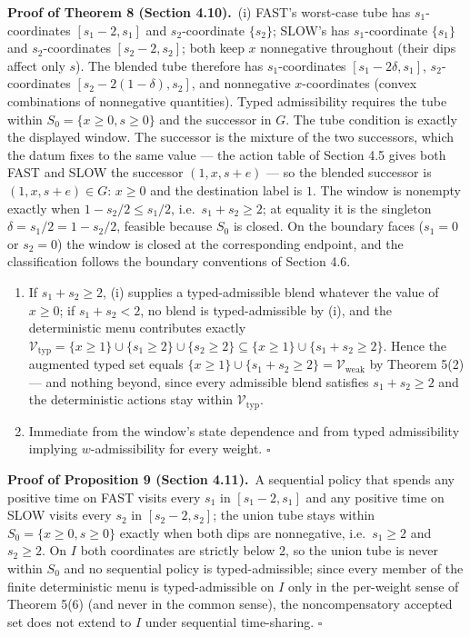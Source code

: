 \documentclass[review,11pt]{elsarticle}
\begin{document}
\textbf{Proof of Theorem 8 (Section 4.10).}\ (i) FAST's worst-case tube has \(s_1\)-coordinates
\([s_1 - 2, s_1]\) and \(s_2\)-coordinate \(\{s_2\}\); SLOW's has
\(s_1\)-coordinate \(\{s_1\}\) and \(s_2\)-coordinates
\([s_2 - 2, s_2]\); both keep \(x\) nonnegative throughout (their dips
affect only \(s\)). The blended tube therefore has \(s_1\)-coordinates
\([s_1 - 2\delta, s_1]\), \(s_2\)-coordinates
\([s_2 - 2(1-\delta), s_2]\), and nonnegative \(x\)-coordinates (convex
combinations of nonnegative quantities). Typed admissibility requires
the tube within \(S_0 = \{x \ge 0, s \ge 0\}\) and the successor in
\(G\). The tube condition is exactly the displayed window. The successor
is the mixture of the two successors, which the datum fixes to the same
value --- the action table of Section 4.5 gives both FAST and SLOW the
successor \((1, x, s + e)\) --- so the blended successor is
\((1, x, s + e) \in G\): \(x \ge 0\) and the destination label is \(1\).
The window is nonempty exactly when \(1 - s_2/2 \le s_1/2\),
i.e.~\(s_1 + s_2 \ge 2\); at equality it is the singleton
\(\delta = s_1/2 = 1 - s_2/2\), feasible because \(S_0\) is closed. On
the boundary faces (\(s_1 = 0\) or \(s_2 = 0\)) the window is closed at
the corresponding endpoint, and the classification follows the boundary
conventions of Section 4.6.

\begin{enumerate}
\def\labelenumi{(\roman{enumi})}
\setcounter{enumi}{1}
\item
  If \(s_1 + s_2 \ge 2\), (i) supplies a typed-admissible blend whatever
  the value of \(x \ge 0\); if \(s_1 + s_2 < 2\), no blend is
  typed-admissible by (i), and the deterministic menu contributes
  exactly
  \(\mathcal{V}_{\mathrm{typ}} = \{x \ge 1\} \cup \{s_1 \ge 2\} \cup \{s_2 \ge 2\} \subseteq \{x \ge 1\} \cup \{s_1 + s_2 \ge 2\}\).
  Hence the augmented typed set equals
  \(\{x \ge 1\} \cup \{s_1 + s_2 \ge 2\} = \mathcal{V}_{\mathrm{weak}}\)
  by Theorem 5(2) --- and nothing beyond, since every admissible blend
  satisfies \(s_1 + s_2 \ge 2\) and the deterministic actions stay
  within \(\mathcal{V}_{\mathrm{typ}}\).
\item
  Immediate from the window's state dependence and from typed
  admissibility implying \(w\)-admissibility for every weight. \ensuremath{\square}
\end{enumerate}

\textbf{Proof of Proposition 9 (Section 4.11).}\ A sequential policy that spends any positive time on FAST
visits every \(s_1\) in \([s_1 - 2, s_1]\) and any positive time on SLOW
visits every \(s_2\) in \([s_2 - 2, s_2]\); the union tube stays within
\(S_0 = \{x \ge 0, s \ge 0\}\) exactly when both dips are nonnegative,
i.e.~\(s_1 \ge 2\) and \(s_2 \ge 2\). On \(I\) both coordinates are
strictly below 2, so the union tube is never within \(S_0\) and no
sequential policy is typed-admissible; since every member of the finite
deterministic menu is typed-admissible on \(I\) only in the per-weight
sense of Theorem 5(6) (and never in the common sense), the
noncompensatory accepted set does not extend to \(I\) under sequential
time-sharing. \ensuremath{\square}
\end{document}
